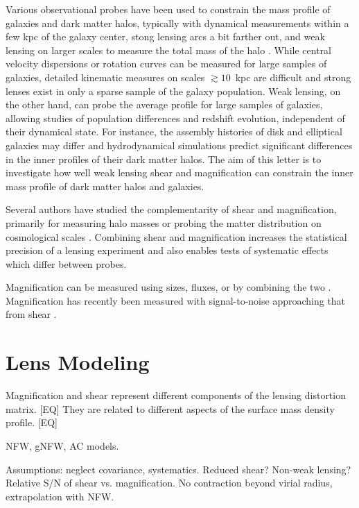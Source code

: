 \documentclass[12pt]{emulateapj}
\begin{document}
Various observational probes have been used to constrain the mass
profile of galaxies and dark matter halos, typically with dynamical
measurements within a few kpc of the galaxy center, stong lensing arcs
a bit farther out, and weak lensing on larger scales to measure the
total mass of the halo \citep[e.g.,][]{Sand2004, Koopmans2006,
  Gavazzi2007, Jiang2007, Auger2010, Schulz2010, Newman2013a}.  While
central velocity dispersions or rotation curves can be measured for
large samples of galaxies, detailed kinematic measures on scales
$\gtrsim10$~kpc are difficult and strong lenses exist in only a sparse
sample of the galaxy population. Weak lensing, on the other hand, can
probe the average profile for large samples of galaxies, allowing
studies of population differences and redshift evolution, independent
of their dynamical state. For instance, the assembly histories of disk
and elliptical galaxies may differ and hydrodynamical simulations
predict significant differences in the inner profiles of their dark
matter halos.  The aim of this letter is to investigate how well weak
lensing shear and magnification can constrain the inner mass profile
of dark matter halos and galaxies.

Several authors have studied the complementarity of shear and
magnification, primarily for measuring halo masses
\citep{Bartelmann1996, Bridle1998, Schneider2000, vanWaerbeke2010b,
  Rozo2010, Umetsu2011} or probing the matter distribution on
cosmological scales \citep{vanWaerbeke2010a, Casaponsa2013,
  Duncan2013, Krause2013}. Combining shear and magnification increases
the statistical precision of a lensing experiment and also enables
tests of systematic effects which differ between probes.

Magnification can be measured using sizes, fluxes, or by combining the
two \citep{}. Magnification has recently been measured with
signal-to-noise approaching that from shear \citep{Scranton2005, Hildebrandt2009,
  Menard2010, Huff2011, Ford2012, Schmidt2012}.

\section{Lens Modeling}

Magnification and shear represent different components of the
lensing distortion matrix. [EQ] They are related to different aspects of
the surface mass density profile. [EQ]

NFW, gNFW, AC models.

Assumptions: neglect covariance, systematics. Reduced shear? Non-weak
lensing? Relative S/N of shear vs. magnification. No contraction
beyond virial radius, extrapolation with NFW.
\end{document}
